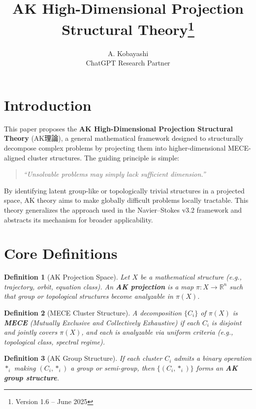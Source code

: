 \documentclass[11pt]{article}
\title{AK High-Dimensional Projection Structural Theory\thanks{Version 1.6 -- June 2025}}
\author{A. Kobayashi \\ ChatGPT Research Partner}
\date{}
\newtheorem{definition}{Definition}[section]
\begin{document}
\maketitle

\section*{Introduction}

This paper proposes the \textbf{AK High-Dimensional Projection Structural Theory} (AK理論), a general mathematical framework designed to structurally decompose complex problems by projecting them into higher-dimensional MECE-aligned cluster structures. The guiding principle is simple:

\begin{quote}
\textit{``Unsolvable problems may simply lack sufficient dimension.''}
\end{quote}

By identifying latent group-like or topologically trivial structures in a projected space, AK theory aims to make globally difficult problems locally tractable. This theory generalizes the approach used in the Navier--Stokes v3.2 framework and abstracts its mechanism for broader applicability.

\section{Core Definitions}

\begin{definition}[AK Projection Space]
Let $X$ be a mathematical structure (e.g., trajectory, orbit, equation class). An \textbf{AK projection} is a map $\pi : X \to \mathbb{R}^n$ such that group or topological structures become analyzable in $\pi(X)$.
\end{definition}

\begin{definition}[MECE Cluster Structure]
A decomposition $\{C_i\}$ of $\pi(X)$ is \textbf{MECE} (Mutually Exclusive and Collectively Exhaustive) if each $C_i$ is disjoint and jointly covers $\pi(X)$, and each is analyzable via uniform criteria (e.g., topological class, spectral regime).
\end{definition}

\begin{definition}[AK Group Structure]
If each cluster $C_i$ admits a binary operation $*_i$ making $(C_i, *_i)$ a group or semi-group, then $\{(C_i, *_i)\}$ forms an \textbf{AK group structure}.
\end{definition}
\end{document}
